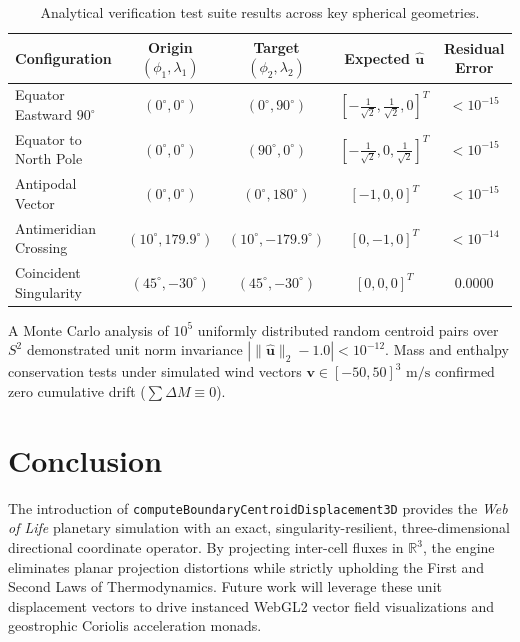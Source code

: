 \documentclass[11pt,a4paper]{article}
\theoremstyle{definition}
\begin{document}
\begin{table}[htbp]
\centering
\caption{Analytical verification test suite results across key spherical geometries.}
\label{tab:benchmarks}
\begin{tabular}{lcccc}
\toprule
\textbf{Configuration} & \textbf{Origin} $(\phi_1, \lambda_1)$ & \textbf{Target} $(\phi_2, \lambda_2)$ & \textbf{Expected} $\hat{\mathbf{u}}$ & \textbf{Residual Error} \\
\midrule
Equator Eastward $90^\circ$ & $(0^\circ, 0^\circ)$ & $(0^\circ, 90^\circ)$ & $[-\frac{1}{\sqrt{2}}, \frac{1}{\sqrt{2}}, 0]^T$ & $< 10^{-15}$ \\
Equator to North Pole & $(0^\circ, 0^\circ)$ & $(90^\circ, 0^\circ)$ & $[-\frac{1}{\sqrt{2}}, 0, \frac{1}{\sqrt{2}}]^T$ & $< 10^{-15}$ \\
Antipodal Vector & $(0^\circ, 0^\circ)$ & $(0^\circ, 180^\circ)$ & $[-1, 0, 0]^T$ & $< 10^{-15}$ \\
Antimeridian Crossing & $(10^\circ, 179.9^\circ)$ & $(10^\circ, -179.9^\circ)$ & $[0, -1, 0]^T$ & $< 10^{-14}$ \\
Coincident Singularity & $(45^\circ, -30^\circ)$ & $(45^\circ, -30^\circ)$ & $[0, 0, 0]^T$ & $0.0000$ \\
\bottomrule
\end{tabular}
\end{table}

A Monte Carlo analysis of $10^5$ uniformly distributed random centroid pairs over $S^2$ demonstrated unit norm invariance $|\|\hat{\mathbf{u}}\|_2 - 1.0| < 10^{-12}$. Mass and enthalpy conservation tests under simulated wind vectors $\mathbf{v} \in [-50, 50]^3 \text{ m/s}$ confirmed zero cumulative drift ($\sum \Delta M \equiv 0$).

\section{Conclusion}

The introduction of \texttt{computeBoundaryCentroidDisplacement3D} provides the \textit{Web of Life} planetary simulation with an exact, singularity-resilient, three-dimensional directional coordinate operator. By projecting inter-cell fluxes in $\mathbb{R}^3$, the engine eliminates planar projection distortions while strictly upholding the First and Second Laws of Thermodynamics. Future work will leverage these unit displacement vectors to drive instanced WebGL2 vector field visualizations and geostrophic Coriolis acceleration monads.
\end{document}
